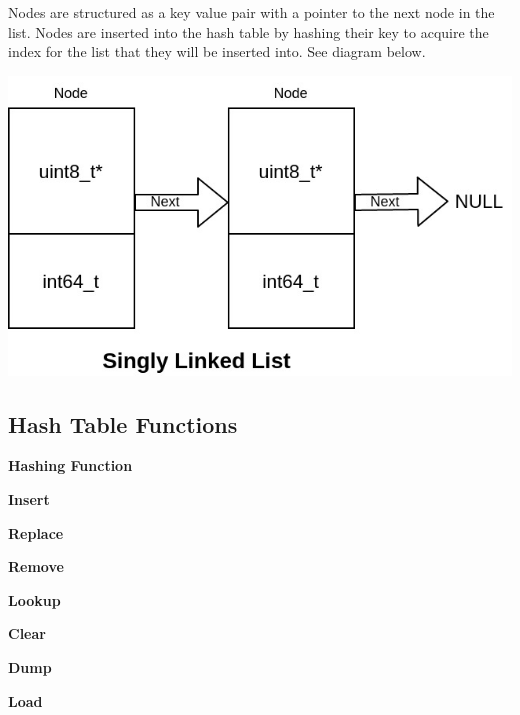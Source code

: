 \documentclass[11pt,letterpaper]{article}
\begin{document}
Nodes are structured as a key value pair with a pointer to the next node in the list. Nodes are inserted into the hash table by hashing their key to acquire the index for the list that they will be inserted into. See diagram below.

\begin{center}
\includegraphics[scale=.4]{node.jpg}
\end{center}

\subsection{Hash Table Functions}
\begin{center}

\textbf{\footnotesize{Hashing Function}}
\end{center}
\begin{minipage}{\linewidth}
\begin{center}

\textbf{\footnotesize{Insert}}
\end{center}
\end{minipage}
\begin{center}

\textbf{\footnotesize{Replace}}
\end{center}
\begin{center}

\textbf{\footnotesize{Remove}}
\end{center}
\begin{minipage}{\linewidth}
\begin{center}

\textbf{\footnotesize{Lookup}}
\end{center}
\end{minipage}
\begin{center}

\textbf{\footnotesize{Clear}}
\end{center}
\begin{center}

\textbf{\footnotesize{Dump}}
\end{center}
\begin{minipage}{\linewidth}
\begin{center}

\textbf{\footnotesize{Load}}
\end{center}
\end{minipage}
\end{document}
